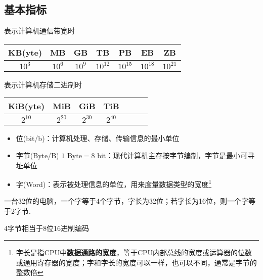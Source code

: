 \subsection{基本指标}
表示计算机通信带宽时
\begin{center}
\begin{tabular}{ccccccc}\hline
KB(yte) & MB & GB & TB & PB & EB & ZB\\\hline
$10^3$ & $10^6$ & $10^9$ & $10^{12}$ & $10^{15}$ & $10^{18}$ & $10^{21}$\\\hline
\end{tabular}
\end{center}
表示计算机存储二进制时
\begin{center}
\begin{tabular}{ccccccc}\hline
KiB(yte) & MiB & GiB & TiB\\\hline
$2^{10}$ & $2^{20}$ & $2^{30}$ & $2^{40}$\\\hline
\end{tabular}
\end{center}
\begin{itemize}
	\item 位(bit/b)：计算机处理、存储、传输信息的最小单位
	\item 字节(Byte/B) $1\text{ Byte}=8\text{ bit}$：现代计算机主存按字节编制，字节是最小可寻址单位
	\item 字(Word)：表示被处理信息的单位，用来度量数据类型的宽度\footnote{字长是指CPU中\textbf{数据通路的宽度}，等于CPU内部总线的宽度或运算器的位数或通用寄存器的宽度；字和字长的宽度可以一样，也可以不同，通常是字节的整数倍}
\end{itemize}
\par 一台32位的电脑，一个字等于4个字节，字长为32位；若字长为16位，则一个字等于2字节.
\par 4字节相当于8位16进制编码


